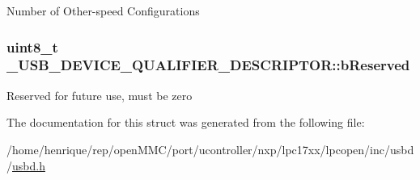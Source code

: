 Number of Other-\/speed Configurations \hypertarget{struct__USB__DEVICE__QUALIFIER__DESCRIPTOR_a8d9c5ddf2a109289513b43ce1effb198}{
\subsubsection[{b\-Reserved}]{\setlength{\rightskip}{0pt plus 5cm}uint8\-\_\-t \-\_\-\-U\-S\-B\-\_\-\-D\-E\-V\-I\-C\-E\-\_\-\-Q\-U\-A\-L\-I\-F\-I\-E\-R\-\_\-\-D\-E\-S\-C\-R\-I\-P\-T\-O\-R\-::b\-Reserved}}\label{struct__USB__DEVICE__QUALIFIER__DESCRIPTOR_a8d9c5ddf2a109289513b43ce1effb198}
Reserved for future use, must be zero 

The documentation for this struct was generated from the following file\-:\begin{DoxyCompactItemize}
\item 
/home/henrique/rep/open\-M\-M\-C/port/ucontroller/nxp/lpc17xx/lpcopen/inc/usbd/\hyperlink{usbd_8h}{usbd.\-h}\end{DoxyCompactItemize}
